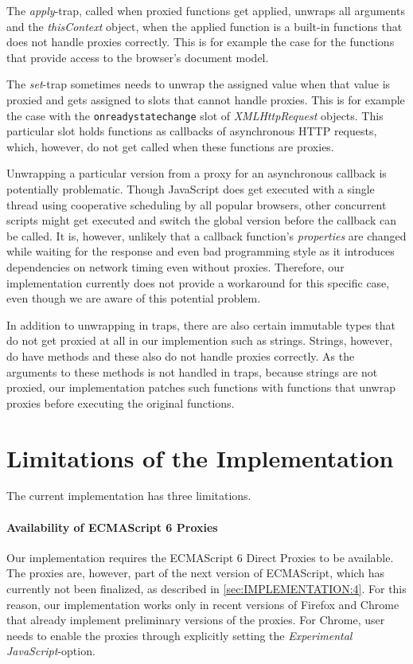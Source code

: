The \emph{apply}-trap, called when proxied functions get applied, unwraps all arguments and the \emph{thisContext} object, when the applied function is a built-in functions that does not handle proxies correctly.
This is for example the case for the functions that provide access to the browser's document model.

The \emph{set}-trap sometimes needs to unwrap the assigned value when that value is proxied and gets assigned to slots that cannot handle proxies.
This is for example the case with the \lstinline{onreadystatechange} slot of \emph{XMLHttpRequest} objects.
This particular slot holds functions as callbacks of asynchronous HTTP requests, which, however, do not get called when these functions are proxies.

Unwrapping a particular version from a proxy for an asynchronous callback is potentially problematic.
Though JavaScript does get executed with a single thread using cooperative scheduling by all popular browsers, other concurrent scripts might get executed and switch the global version before the callback can be called.
It is, however, unlikely that a callback function's \emph{properties} are changed while waiting for the response and even bad programming style as it introduces dependencies on network timing even without proxies.
Therefore, our implementation currently does not provide a workaround for this specific case, even though we are aware of this potential problem. 

In addition to unwrapping in traps, there are also certain immutable types that do not get proxied at all in our implemention such as strings.
Strings, however, do have methods and these also do not handle proxies correctly.
As the arguments to these methods is not handled in traps, because strings are not proxied, our implementation patches such functions with functions that unwrap proxies before executing the original functions.





\section{Limitations of the Implementation}

The current implementation has three limitations.

\paragraph{Availability of ECMAScript 6 Proxies}
Our implementation requires the ECMAScript 6 Direct Proxies to be available.
The proxies are, however, part of the next version of ECMAScript, which has currently not been finalized, as described in \ref{sec:IMPLEMENTATION:4}.
For this reason, our implementation works only in recent versions of Firefox and Chrome that already implement preliminary versions of the proxies.
For Chrome, user needs to enable the proxies through explicitly setting the \emph{Experimental JavaScript}-option.

